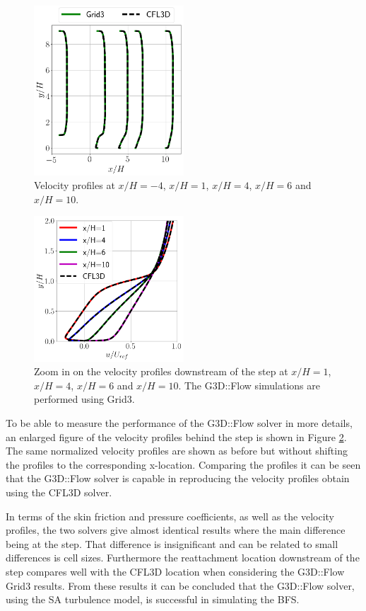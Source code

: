 \begin{figure}[h!]
  \centering
  \includegraphics[width=0.5\textwidth]{figures/BFSVel.png}
  \caption{Velocity profiles at $x/H=-4$, $x/H=1$, $x/H=4$, $x/H=6$ and $x/H=10$.} \label{fig:BFSvel}
\end{figure}
\begin{figure}[h!]
  \centering
  \includegraphics[width=0.5\textwidth]{figures/BFSVelBackStep.png}
  \caption{Zoom in on the velocity profiles downstream of the step at $x/H=1$, $x/H=4$, $x/H=6$ and $x/H=10$. The G3D::Flow simulations are performed using Grid3.} \label{fig:BFSvelBackStep}
\end{figure}
To be able to measure the performance of the G3D::Flow solver in more details, an enlarged figure of the velocity profiles behind the step is shown in Figure \ref{fig:BFSvelBackStep}. The same normalized velocity profiles are shown as before but without shifting the profiles to the corresponding x-location. Comparing the profiles it can be seen that the G3D::Flow solver is capable in reproducing the velocity profiles obtain using the CFL3D solver. 

In terms of the skin friction and pressure coefficients, as well as the velocity profiles, the two solvers give almost identical results where the main difference being at the step. That difference is insignificant and can be related to small differences is cell sizes. Furthermore the reattachment location downstream of the step compares well with the CFL3D location when considering the G3D::Flow Grid3 results. From these results it can be concluded that the G3D::Flow solver, using the SA turbulence model, is successful in simulating the BFS.
